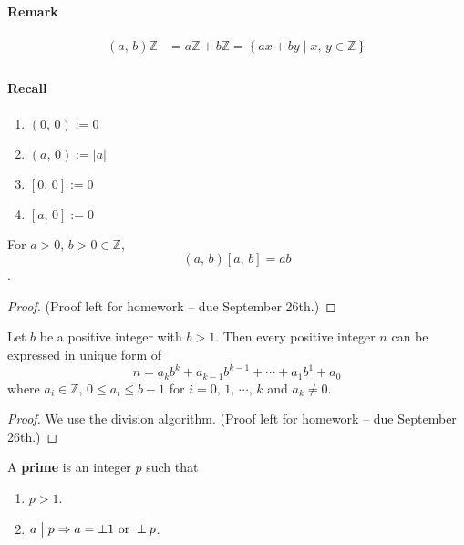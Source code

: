 \paragraph{Remark}

\begin{align*}
    \left(a,\,b\right)\mathbb{Z} &= a\mathbb{Z} + b\mathbb{Z} = \left\{ax+by \mid x,\,y\in\mathbb{Z}\right\} \\
\end{align*}

\paragraph{Recall}
\begin{enumerate}
    \item $\left(0,\,0\right) := 0$
    \item $\left(a,\,0\right) := \left|a\right|$
    \item $\left[0,\,0\right] := 0$
    \item $\left[a,\,0\right] := 0$
\end{enumerate}

\begin{theorem}
    For $a>0,\,b>0\in\mathbb{Z}$, \[\left(a,\,b\right)\left[a,\,b\right] = ab\].
\end{theorem}

\begin{proof}
    (Proof left for homework -- due September 26th.)
\end{proof}

\begin{theorem}
    Let $b$ be a positive integer with $b>1$. Then every positive integer
    $n$ can be expressed in unique form of
    \[
        n=a_kb^k + a_{k-1}b^{k-1} + \cdots + a_1b^1 + a_0
    \]  
    where $a_i \in \mathbb{Z}$, $0 \leq a_i \leq b-1$ for $i=0,\,1,\,\cdots,\,k$
    and $a_k \neq 0$.
\end{theorem}

\begin{proof}
    We use the division algorithm. (Proof left for homework -- due September 26th.)
\end{proof}

\begin{definition}
    A \textbf{prime} is an integer $p$ such that
    \begin{enumerate}
        \item $p>1$.
        \item $a\bigm| p \Rightarrow a = \pm 1 \mbox{ or } \pm p$.
    \end{enumerate}
\end{definition}

